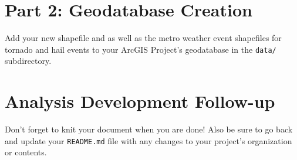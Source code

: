 \documentclass{tufte-handout}
\begin{document}
\vspace{5mm}
\section{Part 2: Geodatabase Creation}
Add your new shapefile and as well as the metro weather event shapefiles for tornado and hail events to your ArcGIS Project's geodatabase in the \texttt{data/} subdirectory.

\vspace{5mm}
\section{Analysis Development Follow-up}
Don't forget to knit your document when you are done! Also be sure to go back and update your \texttt{README.md} file with any changes to your project's organization or contents.


\end{document}
